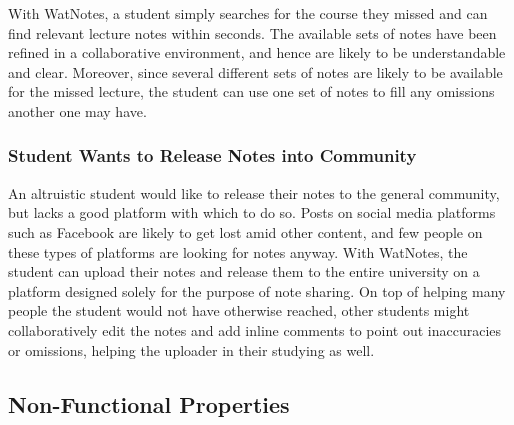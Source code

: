 \documentclass[12pt]{article}
\begin{document}
  With WatNotes, a student simply searches for the course they missed and can find relevant lecture notes within seconds. The available sets of notes have been refined in a collaborative environment, and hence are likely to be understandable and clear. Moreover, since several different sets of notes are likely to be available for the missed lecture, the student can use one set of notes to fill any omissions another one may have.
  \subsubsection{Student Wants to Release Notes into Community}
  An altruistic student would like to release their notes to the general community, but lacks a good platform with which to do so. Posts on social media platforms such as Facebook are likely to get lost amid other content, and few people on these types of platforms are looking for notes anyway. With WatNotes, the student can upload their notes and release them to the entire university on a platform designed solely for the purpose of note sharing. On top of helping many people the student would not have otherwise reached, other students might collaboratively edit the notes and add inline comments to point out inaccuracies or omissions, helping the uploader in their studying as well.
\subsection{Non-Functional Properties}
\end{document}
